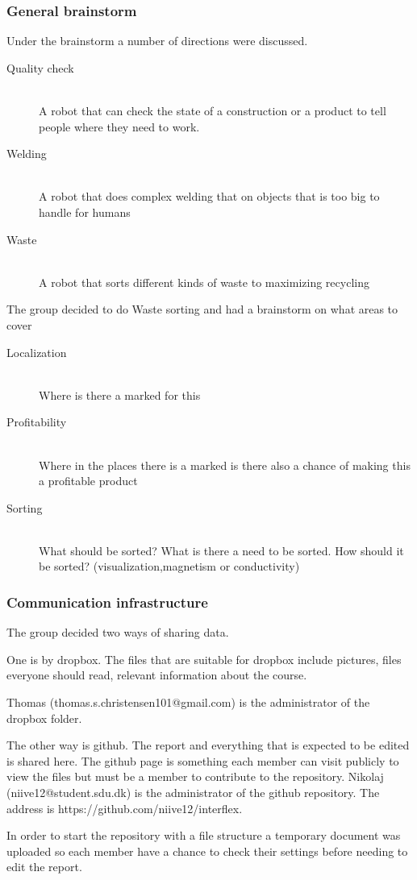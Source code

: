 \subsubsection{General brainstorm}
Under the brainstorm a number of directions were discussed.
\begin{description}
\item[Quality check] \hfill \\
A robot that can check the state of a construction or a product to tell people where they need to work.
\item[Welding] \hfill \\
A robot that does complex welding that on objects that is too big to handle for humans
\item[Waste] \hfill \\
A robot that sorts different kinds of waste to maximizing recycling
\end{description}
The group decided to do Waste sorting and had a brainstorm on what areas to cover
\begin{description}
\item[Localization] \hfill \\
Where is there a marked for this
\item[Profitability] \hfill \\
Where in the places there is a marked is there also a chance of making this a profitable product
\item[Sorting] \hfill \\
What should be sorted? What is there a need to be sorted.
How should it be sorted? (visualization,magnetism or conductivity)
\end{description}

\subsubsection{Communication infrastructure}
The group decided two ways of sharing data.

One is by dropbox. The files that are suitable for dropbox include pictures, files everyone should read, relevant information about the course.

Thomas (thomas.s.christensen101@gmail.com) is the administrator of the dropbox folder.

The other way is github. The report and everything that is expected to be edited is shared here.
The github page is something each member can visit publicly to view the files but must be a member to contribute to the repository.
Nikolaj (niive12@student.sdu.dk) is the administrator of the github repository.
The address is https://github.com/niive12/interflex.

In order to start the repository with a file structure a temporary document was uploaded so each member have a chance to check their settings before needing to edit the report.
